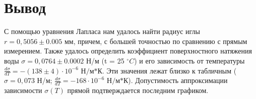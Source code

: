 \documentclass[12pt]{article}
\begin{document}
\section{Вывод}

С помощью уравнения Лапласа нам удалось найти радиус иглы $r= 0,5056 \pm 0.005  \text{ мм}$, причем, с большей точностью по сравнению с прямым измерением. Также удалось определить коэффициент поверхностного натяжения воды $\sigma = 0,0764 \pm 0.0002$ Н/м (t = 25 $^\circ C$) и его зависимость от температуры $\frac{d\sigma}{dT} = - (138 \pm 4) \cdot 10^{-6} \text{ Н/м*К}$. Эти значения лежат близко к табличным ($\sigma = 0,073$ Н/м; $\frac{d\sigma}{dT} = - 168 \cdot 10^{-6} \text{ Н/м*К}$). Допустимость аппроксимации зависимости $\sigma(T)$ прямой подтверждается последним графиком.
\end{document}
